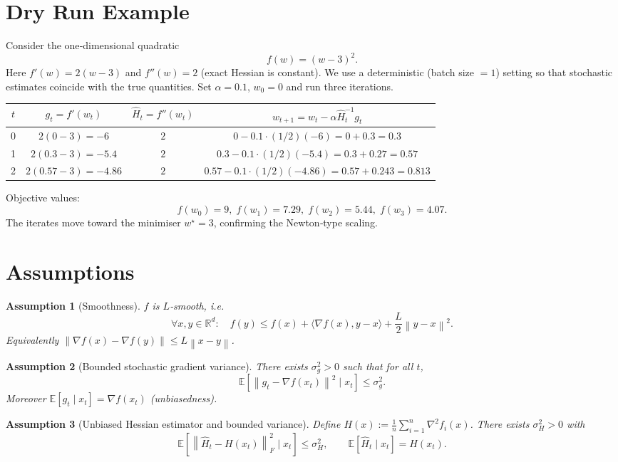 \documentclass{article}
\newtheorem{assumption}{Assumption}
\newcommand{\E}{\mathbb{E}}
\newcommand{\R}{\mathbb{R}}
\newcommand{\norm}[1]{\left\lVert#1\right\rVert}
\newcommand{\grad}{\nabla}
\begin{document}
\section*{Dry Run Example}
Consider the one‑dimensional quadratic 
\[
f(w)=(w-3)^{2}.
\]
Here $f'(w)=2(w-3)$ and $f''(w)=2$ (exact Hessian is constant).  
We use a deterministic (batch size $=1$) setting so that stochastic estimates coincide with the true quantities.  
Set $\alpha=0.1$, $w_0=0$ and run three iterations.

\begin{center}
\begin{tabular}{c|c|c|c}
$t$ & $g_t= f'(w_t)$ & $\widehat H_t = f''(w_t)$ & $w_{t+1}=w_t-\alpha\widehat H_t^{-1}g_t$ \\ \hline
0 & $2(0-3)=-6$ & $2$ & $0-0.1\cdot(1/2)(-6)=0+0.3=0.3$ \\[4pt]
1 & $2(0.3-3)=-5.4$ & $2$ & $0.3-0.1\cdot(1/2)(-5.4)=0.3+0.27=0.57$ \\[4pt]
2 & $2(0.57-3)=-4.86$ & $2$ & $0.57-0.1\cdot(1/2)(-4.86)=0.57+0.243=0.813$
\end{tabular}
\end{center}
Objective values:
\[
f(w_0)=9,\; f(w_1)=7.29,\; f(w_2)=5.44,\; f(w_3)=4.07.
\]
The iterates move toward the minimiser $w^{\star}=3$, confirming the Newton‑type scaling.

\newpage
\section*{Assumptions}
\begin{assumption}[Smoothness]\label{ass:smooth}
$f$ is $L$‑smooth, i.e.
\[
\forall x,y\in\R^{d}:\quad
f(y)\le f(x)+\langle\grad f(x),y-x\rangle+\frac{L}{2}\norm{y-x}^{2}.
\]
Equivalently $\norm{\grad f(x)-\grad f(y)}\le L\norm{x-y}$.
\end{assumption}

\begin{assumption}[Bounded stochastic gradient variance]\label{ass:gradvar}
There exists $\sigma_g^{2}>0$ such that for all $t$,
\[
\E\!\left[\norm{g_t-\grad f(x_t)}^{2}\mid x_t\right]\le\sigma_g^{2}.
\]
Moreover $\E[g_t\mid x_t]=\grad f(x_t)$ (unbiasedness).
\end{assumption}

\begin{assumption}[Unbiased Hessian estimator and bounded variance]\label{ass:hessian}
Define $H(x):=\frac{1}{n}\sum_{i=1}^{n}\grad^{2}f_i(x)$.  
There exists $\sigma_H^{2}>0$ with
\[
\E\!\left[\norm{\widehat H_t-H(x_t)}_{F}^{2}\mid x_t\right]\le\sigma_H^{2},
\qquad
\E[\widehat H_t\mid x_t]=H(x_t).
\]
\end{assumption}
\end{document}
